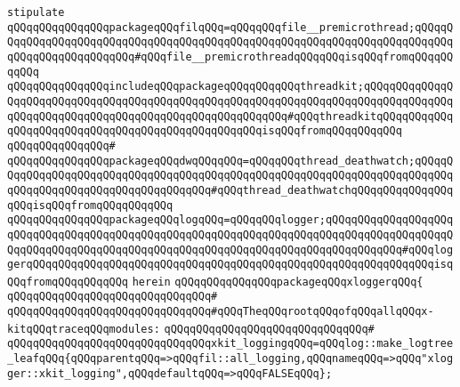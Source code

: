 \verb|stipulate|\newline
\verb|qQQqqQQqqQQqqQQqpackageqQQqfilqQQq=qQQqqQQqfile__premicrothread;qQQqqQQqqQQqqQQqqQQqqQQqqQQqqQQqqQQqqQQqqQQqqQQqqQQqqQQqqQQqqQQqqQQqqQQqqQQqqQQqqQQqqQQqqQQqqQQq#qQQqfile__premicrothreadqQQqqQQqisqQQqfromqQQqqQQqqQQq|\newline
\newline
\verb|qQQqqQQqqQQqqQQqincludeqQQqpackageqQQqqQQqqQQqthreadkit;qQQqqQQqqQQqqQQqqQQqqQQqqQQqqQQqqQQqqQQqqQQqqQQqqQQqqQQqqQQqqQQqqQQqqQQqqQQqqQQqqQQqqQQqqQQqqQQqqQQqqQQqqQQqqQQqqQQqqQQqqQQqqQQq#qQQqthreadkitqQQqqQQqqQQqqQQqqQQqqQQqqQQqqQQqqQQqqQQqqQQqqQQqqQQqisqQQqfromqQQqqQQqqQQq|\newline
\verb|qQQqqQQqqQQqqQQq#|\newline
\verb|qQQqqQQqqQQqqQQqpackageqQQqdwqQQqqQQq=qQQqqQQqthread_deathwatch;qQQqqQQqqQQqqQQqqQQqqQQqqQQqqQQqqQQqqQQqqQQqqQQqqQQqqQQqqQQqqQQqqQQqqQQqqQQqqQQqqQQqqQQqqQQqqQQqqQQqqQQqqQQq#qQQqthread_deathwatchqQQqqQQqqQQqqQQqqQQqisqQQqfromqQQqqQQqqQQq|\newline
\verb|qQQqqQQqqQQqqQQqpackageqQQqlogqQQq=qQQqqQQqlogger;qQQqqQQqqQQqqQQqqQQqqQQqqQQqqQQqqQQqqQQqqQQqqQQqqQQqqQQqqQQqqQQqqQQqqQQqqQQqqQQqqQQqqQQqqQQqqQQqqQQqqQQqqQQqqQQqqQQqqQQqqQQqqQQqqQQqqQQqqQQqqQQqqQQqqQQq#qQQqloggerqQQqqQQqqQQqqQQqqQQqqQQqqQQqqQQqqQQqqQQqqQQqqQQqqQQqqQQqqQQqqQQqisqQQqfromqQQqqQQqqQQq|\newline
\verb|herein|\newline
\newline
\verb|qQQqqQQqqQQqqQQqpackageqQQqxloggerqQQq{|\newline
\verb|qQQqqQQqqQQqqQQqqQQqqQQqqQQqqQQq#|\newline
\newline
\verb|qQQqqQQqqQQqqQQqqQQqqQQqqQQqqQQq#qQQqTheqQQqrootqQQqofqQQqallqQQqx-kitqQQqtraceqQQqmodules:|\newline
\verb|qQQqqQQqqQQqqQQqqQQqqQQqqQQqqQQq#|\newline
\verb|qQQqqQQqqQQqqQQqqQQqqQQqqQQqqQQqxkit_loggingqQQq=qQQqlog::make_logtree_leafqQQq{qQQqparentqQQq=>qQQqfil::all_logging,qQQqnameqQQq=>qQQq"xlogger::xkit_logging",qQQqdefaultqQQq=>qQQqFALSEqQQq};|\newline
